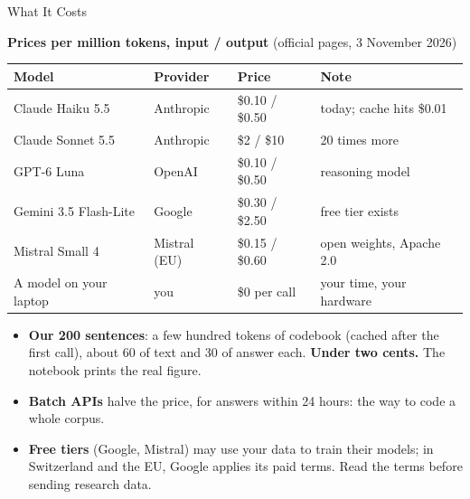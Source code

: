 \begin{frame}{What It Costs}

\small
\textbf{Prices per million tokens, input / output} {\footnotesize (official pages, 3 November 2026)}

\vspace{0.1cm}
\centering
{\footnotesize
\renewcommand{\arraystretch}{1.1}
\begin{tabular}{@{}llll@{}}
\toprule
\textbf{Model} & \textbf{Provider} & \textbf{Price} & \textbf{Note} \\
\midrule
Claude Haiku 5.5 & Anthropic & \$0.10 / \$0.50 & today; cache hits \$0.01 \\
Claude Sonnet 5.5 & Anthropic & \$2 / \$10 & 20 times more \\
GPT-6 Luna & OpenAI & \$0.10 / \$0.50 & reasoning model \\
Gemini 3.5 Flash-Lite & Google & \$0.30 / \$2.50 & free tier exists \\
Mistral Small 4 & Mistral (EU) & \$0.15 / \$0.60 & open weights, Apache 2.0 \\
A model on your laptop & you & \$0 per call & your time, your hardware \\
\bottomrule
\end{tabular}}

\vspace{0.3cm}
\raggedright
\begin{itemize}
    \setlength{\itemsep}{3pt}
    \item \textbf{Our 200 sentences}: a few hundred tokens of codebook (cached after the first call), about 60 of text and 30 of answer each. \textbf{Under two cents.} The notebook prints the real figure.
    \item \textbf{Batch APIs} halve the price, for answers within 24 hours: the way to code a whole corpus.
    \item \textbf{Free tiers} (Google, Mistral) may use your data to train their models; in Switzerland and the EU, Google applies its paid terms. Read the terms before sending research data.
\end{itemize}

\end{frame}

